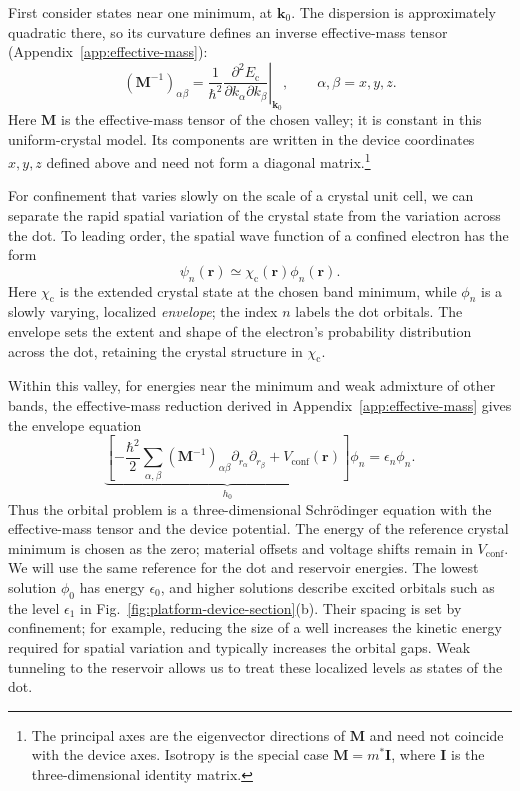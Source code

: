 First consider states near one minimum, at $\mathbf k_0$.
The dispersion is approximately quadratic there, so its curvature
defines an inverse effective-mass tensor
(Appendix~\ref{app:effective-mass}):
\begin{equation}
  (\mathbf M^{-1})_{\alpha\beta}
      =\frac{1}{\hbar^2}
        \left.\frac{\partial^2E_{\mathrm c}}
                     {\partial k_\alpha\partial k_\beta}
        \right|_{\mathbf k_0},
  \qquad \alpha,\beta=x,y,z.
  \label{eq:dot-band-curvature}
\end{equation}
Here $\mathbf M$ is the effective-mass tensor of the chosen valley;
it is constant in this uniform-crystal model. Its components are
written in the device coordinates $x,y,z$ defined above and need
not form a diagonal matrix.\footnote{The principal axes are the
eigenvector directions of $\mathbf M$ and need not coincide with the
device axes. Isotropy is the special case $\mathbf M=m^*\mathbf I$,
where $\mathbf I$ is the three-dimensional identity matrix.}

For confinement that varies slowly on the scale of a crystal unit
cell, we can separate the rapid spatial variation of the crystal
state from the variation across the dot. To leading order, the
spatial wave function of a confined electron has the form
\[
  \psi_n(\mathbf r)\simeq
       \chi_{\mathrm c}(\mathbf r)\phi_n(\mathbf r).
\]
Here $\chi_{\mathrm c}$ is the extended crystal state at the chosen
band minimum, while $\phi_n$ is a slowly varying, localized
\emph{envelope}; the index $n$ labels the dot orbitals. The envelope
sets the extent and shape of the electron's probability distribution
across the dot, retaining the crystal structure in $\chi_{\mathrm c}$.

Within this valley, for energies near the minimum and weak
admixture of other bands, the effective-mass reduction derived in
Appendix~\ref{app:effective-mass} gives the envelope equation
\begin{equation}
  \underbrace{
    \left[-\frac{\hbar^2}{2}\sum_{\alpha,\beta}
             (\mathbf M^{-1})_{\alpha\beta}
             \partial_{r_\alpha}\partial_{r_\beta}
          +V_{\mathrm{conf}}(\mathbf r)\right]
  }_{h_0}\phi_n=\epsilon_n\phi_n.
  \label{eq:dot-orbital-eigenproblem}
\end{equation}
Thus the orbital problem is a three-dimensional Schr\"odinger
equation with the effective-mass tensor and the device potential. The energy
of the reference crystal minimum is chosen as the zero; material
offsets and voltage shifts remain in $V_{\mathrm{conf}}$. We will use
the same reference for the dot and reservoir energies. The lowest
solution $\phi_0$ has energy $\epsilon_0$, and higher solutions describe
excited orbitals such as the level $\epsilon_1$ in
Fig.~\ref{fig:platform-device-section}(b).
Their spacing is set by confinement; for example, reducing the size
of a well increases the kinetic energy required for spatial variation
and typically increases the orbital gaps. Weak tunneling to the
reservoir allows us to treat these localized levels as states of
the dot.

